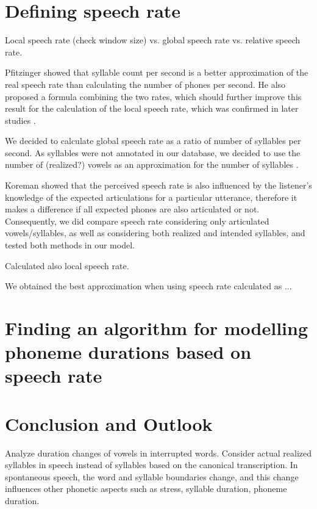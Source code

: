 \documentclass[a4paper]{scrreprt}
\begin{document}
\chapter{Defining speech rate}

Local speech rate (check window size) vs. global speech rate vs. relative speech rate.

Pfitzinger \cite{Pfitzinger1998} showed that syllable count per second is a better approximation of the real speech rate than calculating the number of phones per second. He also proposed a formula combining the two rates, which should further improve this result for the calculation of the local speech rate, which was confirmed in later studies \cite{Pfitzinger1999}.

We decided to calculate global speech rate as a ratio of number of syllables per second. As syllables were not annotated in our database, we decided to use the number of (realized?) vowels as an approximation for the number of syllables \cite{Yishan_Jiao_2015} \cite{Kohler1995}.

Koreman showed \cite{Koreman_2006} that the perceived speech rate is also influenced by the listener's knowledge of the expected articulations for a particular utterance, therefore it makes a difference if all expected phones are also articulated or not. Consequently, we did compare speech rate considering only articulated vowels/syllables, as well as considering both realized and intended syllables,  and tested both methods in our model.

Calculated also local speech rate.

We obtained the best approximation when using speech rate calculated as ...

\chapter{Finding an algorithm for modelling phoneme durations based on speech rate}

\chapter{Conclusion and Outlook}
Analyze duration changes of vowels in interrupted words.
Consider actual realized syllables in speech instead of syllables based on the canonical transcription. In spontaneous speech, the word and syllable boundaries change, and this change influences other phonetic aspects such as stress, syllable duration, phoneme duration.

\printbibliography
\end{document}
